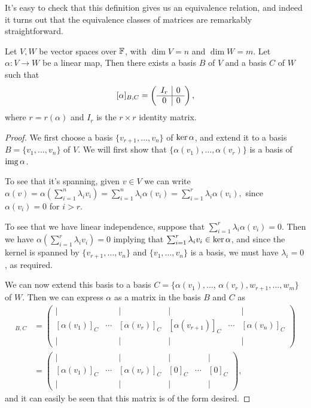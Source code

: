 \documentclass[a4paper]{scrartcl}
\begin{document}
It's easy to check that this definition gives us an equivalence relation, and indeed it turns out that the equivalence classes of matrices are remarkably straightforward.

\begin{proposition}
    Let $V, W$ be vector spaces over $\mathbb{F}$, with $\dim V = n$ and $\dim W = m$. Let $\alpha: V \rightarrow W$ be a linear map, Then there exists a basis $B$ of $V$ and a basis $C$ of $W$ such that
    $$
    [\alpha]_{B, C} = \left(\begin{array}{ c | c }
        I_r & 0 \\
        \hline
        0 & 0
      \end{array}\right),
    $$
    where $r = r(\alpha)$ and $I_r$ is the $r \times r$ identity matrix.
\end{proposition}
\begin{proof}
    We first choose a basis $\{v_{r + 1}, \dots, v_n\}$ of $\operatorname{ker} \alpha$, and extend it to a basis $B = \{v_1, \dots, v_n\}$ of $V$.
    We will first show that $\{\alpha(v_1), \dots, \alpha(v_r)\}$ is a basis of $\operatorname{img} \alpha$.

    To see that it's spanning, given $v \in V$ we can write
    $\alpha(v) = \alpha\left(\sum_{i = 1}^n \lambda_i v_i\right) = \sum_{i = 1}^n \lambda_i \alpha(v_i) = \sum_{i =1}^r \lambda_i \alpha(v_i),
    $
    since $\alpha(v_i) = 0$ for $i > r$.
    
    To see that we have linear independence, suppose that $\sum_{i = 1}^r \lambda_i \alpha(v_i) = 0$. Then we have
    $
\alpha\left(\sum_{i = 1}^r \lambda_i v_i\right) = 0$ implying that
$\sum_{i = 1}^r \lambda_i v_i \in \operatorname{ker} \alpha$,
    and since the kernel is spanned by $\{v_{r + 1}, \dots, v_n\}$ and $\{v_1, \dots, v_n\}$ is a basis, we must have $\lambda_i = 0$, as required.

    We can now extend this basis to a basis $C = \{\alpha(v_1), \dots$, $\alpha(v_r), w_{r + 1}, \dots, w_m \}$ of $W$. Then we can express $\alpha$ as a matrix in the basis $B$ and $C$ as
    \begin{align*}
        [\alpha]_{B, C} &=
    \begin{pmatrix}
        | &  & | & | &  & |\\
        [\alpha(v_1)]_C & \cdots & [\alpha(v_r)]_C & [\alpha(v_{r + 1})]_C & \cdots & [\alpha(v_n)]_C \\
        | &  & | & | &  & |
    \end{pmatrix} \\
    &= \begin{pmatrix}
        | &  & | & | &  & |\\
        [\alpha(v_1)]_C & \cdots & [\alpha(v_r)]_C & [0]_C & \cdots & [0]_C \\
        | &  & | & | &  & |
    \end{pmatrix},
    \end{align*}
    and it can easily be seen that this matrix is of the form desired.
\end{proof}
\end{document}

